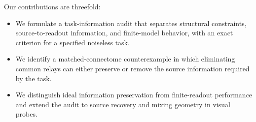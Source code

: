 Our contributions are threefold:
\begin{itemize}
  \item We formulate a task-information audit that separates structural
        constraints, source-to-readout information, and finite-model
        behavior, with an exact criterion for a specified noiseless task.
  \item We identify a matched-connectome counterexample in which
        eliminating common relays can either preserve or remove the source
        information required by the task.
  \item We distinguish ideal information preservation from finite-readout
        performance and extend the audit to source recovery and mixing
        geometry in visual probes.
\end{itemize}
